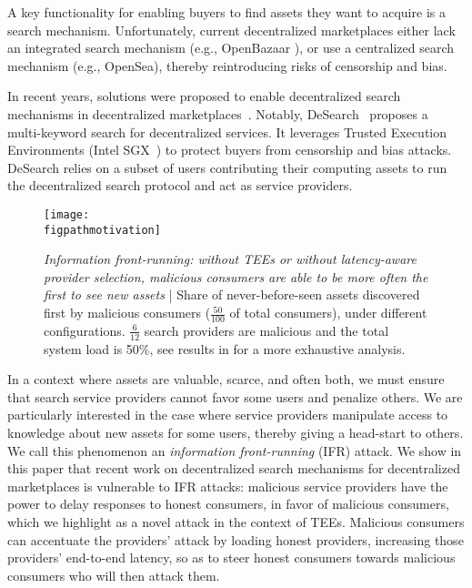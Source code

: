 A key functionality for enabling buyers to find assets they want to acquire is a search mechanism.
Unfortunately, current decentralized marketplaces either lack an integrated search mechanism (e.g., OpenBazaar%
), %
or use a centralized search mechanism (e.g., OpenSea),
thereby reintroducing risks of censorship and bias. 

In recent years, solutions were proposed to enable decentralized search mechanisms in decentralized marketplaces~\cite{liBringingDecentralizedSearch2021,keizerDittoDecentralisedSimilarity2023,zichichi_towards_2021}.
Notably, DeSearch~\cite{liBringingDecentralizedSearch2021} proposes a multi-keyword search for decentralized services. %
It leverages Trusted Execution Environments (Intel SGX~\cite{costan2016intel}) to protect buyers from censorship and bias attacks.
DeSearch relies on a subset of users contributing their computing assets to run the decentralized search protocol and act as service providers. 

\begin{figure}
  \centering

  \texttt{[image: \\figpathmotivation]}

  \caption{\emph{Information front-running: without TEEs or without latency-aware provider selection, malicious consumers are able to be more often the first to see new assets} | Share of never-before-seen assets discovered first by malicious consumers ($\frac{50}{100}$ of total consumers), under different configurations. %
  $\frac{6}{12}$ search providers are malicious and the total system load is 50\%, see results in  for a more exhaustive analysis.}%
  \label{fig:motivation}\vspace{-0.5cm}
\end{figure}

In a context where assets are valuable, scarce, and often both, we must ensure that search service providers cannot favor some users and penalize others.
We are particularly interested in the case where service providers manipulate access to knowledge about new assets for some users, thereby giving a head-start to others.
We call this phenomenon an \textit{information front-running} (IFR) attack.
We show in this paper that recent work on decentralized search mechanisms for decentralized marketplaces is vulnerable to IFR attacks:
malicious service providers have the power to delay responses to honest consumers, in favor of malicious consumers, which we highlight as a novel attack in the context of TEEs.
Malicious consumers can accentuate the providers' attack by loading honest providers, increasing those providers' end-to-end latency, so as to steer honest consumers towards malicious consumers who will then attack them.

